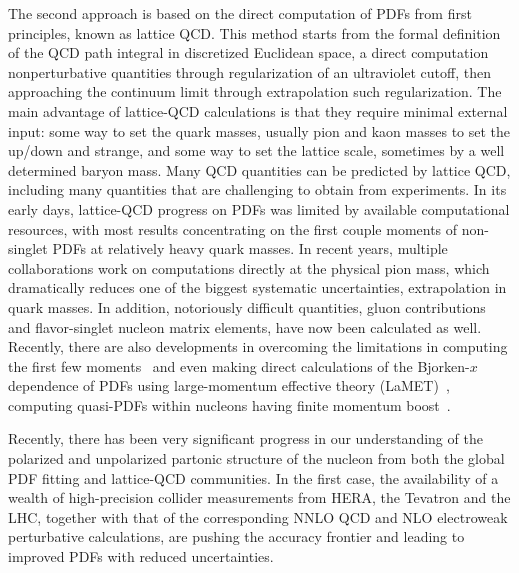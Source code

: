 The second approach is based on the direct computation of PDFs from first principles, 
known as lattice QCD.
This method starts from the formal definition of the QCD path integral in discretized Euclidean space, 
a direct computation nonperturbative quantities
through regularization of an ultraviolet cutoff, then approaching the continuum limit through extrapolation
such regularization. 
%
The main advantage of lattice-QCD calculations is that they require minimal external input:
some way to set the quark masses, usually pion and kaon masses to set the up/down and strange,
and some way to set the lattice scale, sometimes by a well determined baryon mass. 
Many QCD quantities can be predicted by lattice QCD, including many quantities that are challenging to obtain from experiments. 
In its early days, lattice-QCD progress on PDFs was limited by available computational resources,
with most results concentrating on the first couple moments of non-singlet PDFs at relatively heavy quark masses. 
In recent years, multiple collaborations work on computations directly at the physical pion mass, which 
dramatically reduces one of the biggest systematic uncertainties, extrapolation in quark masses. In addition, notoriously difficult quantities, gluon contributions and flavor-singlet nucleon matrix elements, have now been calculated as well. Recently, there are also developments in overcoming the limitations in computing the first few moments~\cite{Constantinou:2014tga,Syritsyn:2014saa,Lin:2012ev} and even making direct calculations of the Bjorken-$x$ dependence of PDFs using large-momentum effective theory (LaMET)~\cite{Ji:2014gla}, computing quasi-PDFs within nucleons having finite momentum boost~\cite{Lin:2014zya,Alexandrou:2015rja,Chen:2016utp,Alexandrou:2016jqi}.

Recently, there has been very significant progress in our understanding
of the polarized and unpolarized partonic structure of the nucleon from both
the global PDF fitting and lattice-QCD communities.
%
In the first case, the availability of a wealth of high-precision collider measurements
from HERA, the Tevatron and the LHC, together with that of the corresponding
NNLO QCD and NLO electroweak perturbative calculations, are pushing the
accuracy frontier and leading to improved PDFs with reduced uncertainties.

